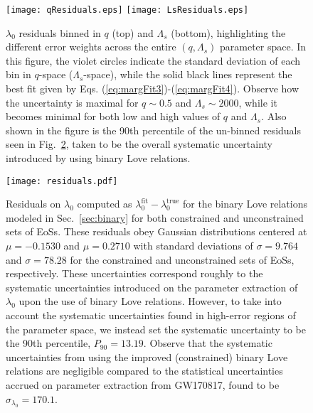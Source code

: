 \documentclass[prd,twocolumn,nofootinbib,superscriptaddress,amsmath,amssymb]{revtex4-1}
\begin{document}
\begin{figure}
\begin{center} 
\texttt{[image: qResiduals.eps]}
\texttt{[image: LsResiduals.eps]}
\end{center}
\caption{$\lambda_0$ residuals binned in $q$ (top) and $\Lambda_s$ (bottom), highlighting the different error weights across the entire $(q,\Lambda_s)$ parameter space.
In this figure, the violet circles indicate the standard deviation of each bin in $q$-space ($\Lambda_s$-space), while the solid black lines represent the best fit given by Eqs. (\ref{eq:margFit3})-(\ref{eq:margFit4}).
Observe how the uncertainty is maximal for $q\sim0.5$ and $\Lambda_s\sim2000$, while it becomes minimal for both low and high values of $q$ and $\Lambda_s$.
Also shown in the figure is the 90th percentile of the un-binned residuals seen in Fig.~\ref{fig:residuals}, taken to be the overall systematic uncertainty introduced by using binary Love relations.
}
\label{fig:qLsResiduals}
\end{figure}

\begin{figure}
\begin{center} 
\texttt{[image: residuals.pdf]}
\end{center}
\caption{
Residuals on $\lambda_0$ computed as $\lambda_0^{\text{fit}}-\lambda_0^{\text{true}}$ for the binary Love relations modeled in Sec.~\ref{sec:binary} for both constrained and unconstrained sets of EoSs.
These residuals obey Gaussian distributions centered at $\mu=-0.1530$ and $\mu=0.2710$ with standard deviations of $\sigma=9.764$ and $\sigma=78.28$ for the constrained and unconstrained sets of EoSs, respectively.
These uncertainties correspond roughly to the systematic uncertainties introduced on the parameter extraction of $\lambda_0$ upon the use of binary Love relations.
However, to take into account the systematic uncertainties found in high-error regions of the parameter space, we instead set the systematic uncertainty to be the 90th percentile, $P_{90}=13.19$.
Observe that the systematic uncertainties from using the improved (constrained) binary Love relations are negligible compared to the statistical uncertainties accrued on parameter extraction from GW170817, found to be $\sigma_{\lambda_0}=170.1$.
}
\label{fig:residuals}
\end{figure}
\end{document}
